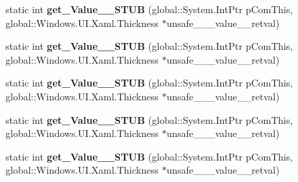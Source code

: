 \begin{DoxyCompactItemize}
\item 
\mbox{\label{struct_system_1_1_nullable___a___windows___u_i___xaml___thickness___v_______impl_1_1_vtbl_a2297870419097f457ddb4df6f7e3d0ff}} 
static int {\bfseries get\+\_\+\+Value\+\_\+\+\_\+\+S\+T\+UB} (global\+::\+System.\+Int\+Ptr p\+Com\+This, global\+::\+Windows.\+U\+I.\+Xaml.\+Thickness $\ast$unsafe\+\_\+\+\_\+\+\_\+value\+\_\+\+\_\+retval)
\item 
\mbox{\label{struct_system_1_1_nullable___a___windows___u_i___xaml___thickness___v_______impl_1_1_vtbl_a2297870419097f457ddb4df6f7e3d0ff}} 
static int {\bfseries get\+\_\+\+Value\+\_\+\+\_\+\+S\+T\+UB} (global\+::\+System.\+Int\+Ptr p\+Com\+This, global\+::\+Windows.\+U\+I.\+Xaml.\+Thickness $\ast$unsafe\+\_\+\+\_\+\+\_\+value\+\_\+\+\_\+retval)
\item 
\mbox{\label{struct_system_1_1_nullable___a___windows___u_i___xaml___thickness___v_______impl_1_1_vtbl_a2297870419097f457ddb4df6f7e3d0ff}} 
static int {\bfseries get\+\_\+\+Value\+\_\+\+\_\+\+S\+T\+UB} (global\+::\+System.\+Int\+Ptr p\+Com\+This, global\+::\+Windows.\+U\+I.\+Xaml.\+Thickness $\ast$unsafe\+\_\+\+\_\+\+\_\+value\+\_\+\+\_\+retval)
\item 
\mbox{\label{struct_system_1_1_nullable___a___windows___u_i___xaml___thickness___v_______impl_1_1_vtbl_a2297870419097f457ddb4df6f7e3d0ff}} 
static int {\bfseries get\+\_\+\+Value\+\_\+\+\_\+\+S\+T\+UB} (global\+::\+System.\+Int\+Ptr p\+Com\+This, global\+::\+Windows.\+U\+I.\+Xaml.\+Thickness $\ast$unsafe\+\_\+\+\_\+\+\_\+value\+\_\+\+\_\+retval)
\item 
\mbox{\label{struct_system_1_1_nullable___a___windows___u_i___xaml___thickness___v_______impl_1_1_vtbl_a2297870419097f457ddb4df6f7e3d0ff}} 
static int {\bfseries get\+\_\+\+Value\+\_\+\+\_\+\+S\+T\+UB} (global\+::\+System.\+Int\+Ptr p\+Com\+This, global\+::\+Windows.\+U\+I.\+Xaml.\+Thickness $\ast$unsafe\+\_\+\+\_\+\+\_\+value\+\_\+\+\_\+retval)
\end{DoxyCompactItemize}
